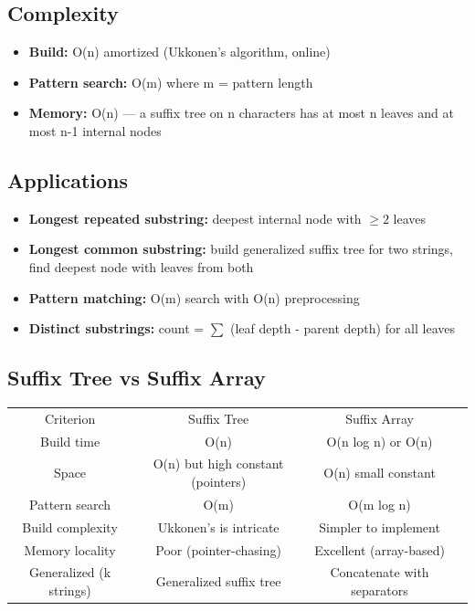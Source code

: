 \subsection{Complexity}

\begin{itemize}
\item \textbf{Build:} O(n) amortized (Ukkonen's algorithm, online)
\item \textbf{Pattern search:} O(m) where m = pattern length
\item \textbf{Memory:} O(n) — a suffix tree on n characters has at most n leaves and at most n-1 internal nodes
\end{itemize}

\subsection{Applications}

\begin{itemize}
\item \textbf{Longest repeated substring:} deepest internal node with $\ge 2$ leaves
\item \textbf{Longest common substring:} build generalized suffix tree for two strings, find deepest node with leaves from both
\item \textbf{Pattern matching:} O(m) search with O(n) preprocessing
\item \textbf{Distinct substrings:} count = $\sum$ (leaf depth - parent depth) for all leaves
\end{itemize}

\subsection{Suffix Tree vs Suffix Array}

\begin{center}
\begin{tabular}{cccc}
\toprule
Criterion & Suffix Tree & Suffix Array \\
Build time & O(n) & O(n log n) or O(n) \\
Space & O(n) but high constant (pointers) & O(n) small constant \\
Pattern search & O(m) & O(m log n) \\
Build complexity & Ukkonen's is intricate & Simpler to implement \\
Memory locality & Poor (pointer-chasing) & Excellent (array-based) \\
Generalized (k strings) & Generalized suffix tree & Concatenate with separators \\
\bottomrule
\end{tabular}
\end{center}

